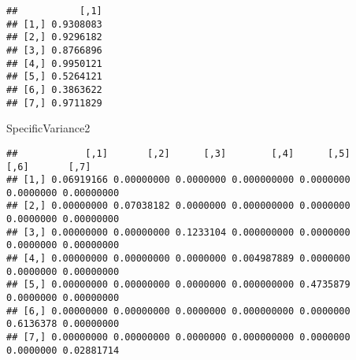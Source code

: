 \documentclass[
]{article}
\newenvironment{Shaded}{\begin{snugshade}}{\end{snugshade}}
\newcommand{\AttributeTok}[1]{\textcolor[rgb]{0.77,0.63,0.00}{#1}}
\newcommand{\CommentTok}[1]{\textcolor[rgb]{0.56,0.35,0.01}{\textit{#1}}}
\newcommand{\ControlFlowTok}[1]{\textcolor[rgb]{0.13,0.29,0.53}{\textbf{#1}}}
\newcommand{\DecValTok}[1]{\textcolor[rgb]{0.00,0.00,0.81}{#1}}
\newcommand{\FunctionTok}[1]{\textcolor[rgb]{0.00,0.00,0.00}{#1}}
\newcommand{\NormalTok}[1]{#1}
\newcommand{\OtherTok}[1]{\textcolor[rgb]{0.56,0.35,0.01}{#1}}
\newcommand{\SpecialCharTok}[1]{\textcolor[rgb]{0.00,0.00,0.00}{#1}}
\begin{document}
\begin{Shaded}
\end{Shaded}

\begin{verbatim}
##           [,1]
## [1,] 0.9308083
## [2,] 0.9296182
## [3,] 0.8766896
## [4,] 0.9950121
## [5,] 0.5264121
## [6,] 0.3863622
## [7,] 0.9711829
\end{verbatim}

\begin{Shaded}
\begin{Highlighting}[]
\NormalTok{SpecificVariance2}
\end{Highlighting}
\end{Shaded}

\begin{verbatim}
##            [,1]       [,2]      [,3]        [,4]      [,5]      [,6]       [,7]
## [1,] 0.06919166 0.00000000 0.0000000 0.000000000 0.0000000 0.0000000 0.00000000
## [2,] 0.00000000 0.07038182 0.0000000 0.000000000 0.0000000 0.0000000 0.00000000
## [3,] 0.00000000 0.00000000 0.1233104 0.000000000 0.0000000 0.0000000 0.00000000
## [4,] 0.00000000 0.00000000 0.0000000 0.004987889 0.0000000 0.0000000 0.00000000
## [5,] 0.00000000 0.00000000 0.0000000 0.000000000 0.4735879 0.0000000 0.00000000
## [6,] 0.00000000 0.00000000 0.0000000 0.000000000 0.0000000 0.6136378 0.00000000
## [7,] 0.00000000 0.00000000 0.0000000 0.000000000 0.0000000 0.0000000 0.02881714
\end{verbatim}
\end{document}

